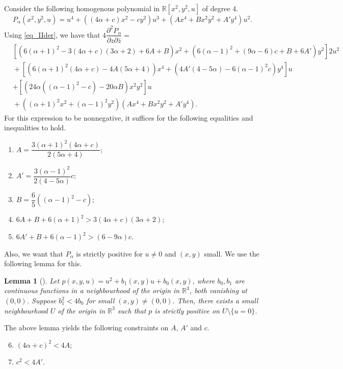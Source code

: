 \documentclass[10pt]{amsart}
\numberwithin{equation}{section}
\theoremstyle{definition}
\theoremstyle{definition}
\theoremstyle{plain}
\newtheorem{lemma}[theorem]{Lemma}
\newcommand{\bes} {\begin{equation*}}
\newcommand{\ees} {\end{equation*}}
\newcommand{\zbar}{\overline{z}}
\newcommand\secpartl[3]{\dfrac{\partial^2{#1}}{\partial{#2}\partial{#3}}}
\newcommand{\rl}{\mathbb{R}}
\begin{document}
Consider the following homogenous polynomial in $\rl[x^2,y^2,u]$ of degree $4$.
	\bes
		P_\alpha(x^2,y^2,u)
			=u^4+\left((4\alpha+c)x^2-cy^2\right)u^3+\left(Ax^4+Bx^2y^2+A'y^4\right)u^2.
	\ees
Using \eqref{eq_IIder}, we have that $4\secpartl{P_\alpha}{z}{\zbar}=$	
\begin{align*}
&\left[\left(6(\alpha+1)^2-3(4\alpha+c)(3\alpha+2)+6A+B\right)x^2+\left(6(\alpha-1)^2+(9\alpha-6)c+B+6A'\right)y^2\right]2u^2\\
	 &{}+\left[(6(\alpha+1)^2(4\alpha+c)-4A(5\alpha+4))x^4
		+(4A'(4-5\alpha)-6(\alpha-1)^2c)y^4\right]u\\
		&+\left[(24\alpha((\alpha-1)^2-c)-20\alpha B)x^2y^2\right]u\\
	 &{}+\left((\alpha+1)^2x^2+(\alpha-1)^2y^2\right)\left(Ax^4+Bx^2y^2+A'y^4\right).
\end{align*}
For this expression to be nonnegative, it suffices for the following equalities and inequalities to hold. 
\renewcommand{\theenumi}{\arabic{enumi}}
	\begin{enumerate}
		\item $A=\dfrac{3(\alpha+1)^2(4\alpha+c)}{2(5\alpha+4)}$;
			\vspace{0.5em}
		\item $A'=\dfrac{3(\alpha-1)^2}{2(4-5\alpha)}c$;
			\vspace{0.5em}
		\item $B=\dfrac{6}{5}((\alpha-1)^2-c)$;
			\vspace{0.5em}
		\item $6A+B+6(\alpha+1)^2>3(4\alpha+c)(3\alpha+2)$;
			\vspace{0.5em}
		\item $6A'+B+6(\alpha-1)^2>(6-9\alpha)c$.
\end{enumerate}
Also, we want that $P_\alpha$ is strictly positive for $u\neq 0$ and $(x,y)$ small. We use the following lemma for this.

\begin{lemma}[{\cite[Lemma $2$.]{Sl04}}]\label{lem_posquad}
Let $p(x,y,u)=u^2+b_1(x,y)u+b_0(x,y)$, where $b_0, b_1$ are continuous functions in a neighbourhood of the origin in $\rl^3$, both vanishing at $(0,0)$. Suppose $b_1^2<4b_0$ for small $(x,y)\neq (0,0)$. Then, there exists a small neighbourhood $U$ of the origin in $\rl^3$ such that $p$ is strictly positive on $U\setminus\{u=0\}$. 
\end{lemma}

\noindent The above lemma yields the following constraints on $A$, $A'$ and $c$. 
\begin{enumerate}
\setcounter{enumi}{5}
\item $(4\alpha+c)^2<4A$;
\item $c^2<4A'$.
\end{enumerate}
\end{document}

